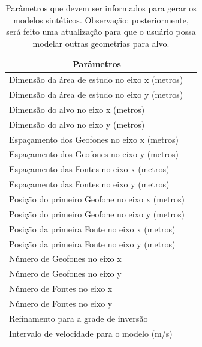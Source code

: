 \documentclass[a4paper, 12 pt]{article} %
\begin{document}
\begin{table}[!hbtp]
	\caption{Parâmetros que devem ser informados para gerar os modelos sintéticos. Observação: posteriormente, será feito uma atualização para que o usuário possa modelar outras geometrias para alvo.}
	\centering
	\label{parametros}
	\begin{tabular}{@{}ll@{}}
		\toprule
		\multicolumn{1}{c}{Parâmetros} &  \\ \midrule
		\rowcolor[HTML]{EFEFEF} 
		Dimensão da área de estudo no eixo x (metros)   
		&   
		\\
		Dimensão da área de estudo no eixo y (metros)   
		& 
		\\
		\rowcolor[HTML]{EFEFEF} 
		Dimensão do alvo no eixo x (metros)         
		&       
		\\
		Dimensão do alvo no eixo y (metros)         
		&    
		\\
		\rowcolor[HTML]{EFEFEF} 
		Espaçamento dos Geofones no eixo x (metros) &           
		\\
		Espaçamento dos Geofones no eixo y (metros)         &           
		\\
		\rowcolor[HTML]{EFEFEF} 
		Espaçamento das Fontes no eixo x (metros)    &                   
		\\
		Espaçamento das Fontes no eixo y (metros)           &    
		\\
		\rowcolor[HTML]{EFEFEF} 
		Posição do primeiro Geofone no eixo x (metros)    &                   
		\\
		Posição do primeiro Geofone no eixo y (metros)    &    
		\\
		\rowcolor[HTML]{EFEFEF} 
		Posição da primeira Fonte no eixo x (metros)    &                   
		\\
		Posição da primeira Fonte no eixo y (metros)        &    
		\\
		\rowcolor[HTML]{EFEFEF} 
		Número de Geofones no eixo x     &                   
		\\
		Número de Geofones no eixo y
		&    
		\\
		\rowcolor[HTML]{EFEFEF} 
		Número de Fontes no eixo x     
		&                   
		\\
		Número de Fontes no eixo y
		&    
		\\
		\rowcolor[HTML]{EFEFEF} 
		Refinamento para a grade de inversão     
		&                   
		\\
		Intervalo de velocidade para o modelo (m/s)
		&      
		                                 \\ \bottomrule
	\end{tabular}
\end{table}
\end{document}
